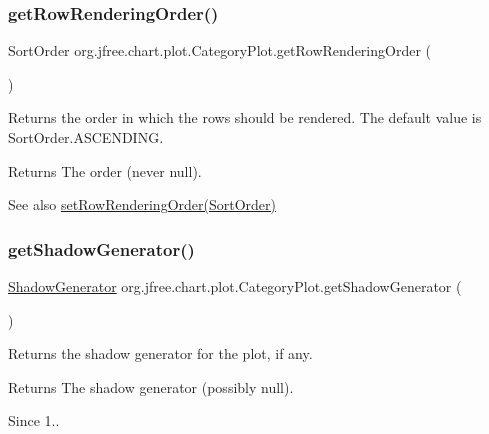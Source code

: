 \subsubsection{\texorpdfstring{get\+Row\+Rendering\+Order()}{getRowRenderingOrder()}}
{\footnotesize\ttfamily Sort\+Order org.\+jfree.\+chart.\+plot.\+Category\+Plot.\+get\+Row\+Rendering\+Order (\begin{DoxyParamCaption}{ }\end{DoxyParamCaption})}

Returns the order in which the rows should be rendered. The default value is {\ttfamily Sort\+Order.\+A\+S\+C\+E\+N\+D\+I\+NG}.

\begin{DoxyReturn}{Returns}
The order (never {\ttfamily null}).
\end{DoxyReturn}
\begin{DoxySeeAlso}{See also}
\mbox{\hyperlink{classorg_1_1jfree_1_1chart_1_1plot_1_1_category_plot_ac4324fcc47e9e5a7b37a7bed1284c656}{set\+Row\+Rendering\+Order(\+Sort\+Order)}} 
\end{DoxySeeAlso}
\mbox{\label{classorg_1_1jfree_1_1chart_1_1plot_1_1_category_plot_a41ee70d4c8b1cc8c54a4999d6191817c}} 
\subsubsection{\texorpdfstring{get\+Shadow\+Generator()}{getShadowGenerator()}}
{\footnotesize\ttfamily \mbox{\hyperlink{interfaceorg_1_1jfree_1_1chart_1_1util_1_1_shadow_generator}{Shadow\+Generator}} org.\+jfree.\+chart.\+plot.\+Category\+Plot.\+get\+Shadow\+Generator (\begin{DoxyParamCaption}{ }\end{DoxyParamCaption})}

Returns the shadow generator for the plot, if any.

\begin{DoxyReturn}{Returns}
The shadow generator (possibly {\ttfamily null}).
\end{DoxyReturn}
\begin{DoxySince}{Since}
1.. 
\end{DoxySince}
\mbox{\label{classorg_1_1jfree_1_1chart_1_1plot_1_1_category_plot_ad53da6d191b15b1c86d02b9be5de2adf}} 
